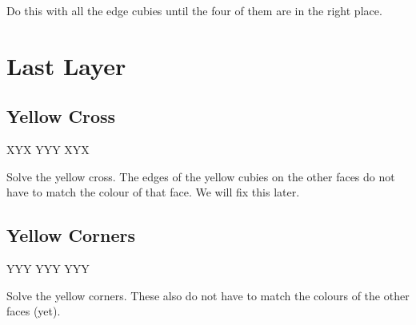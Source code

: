 \documentclass{article}
\begin{document}
    Do this with all the edge cubies until the four of them are in the right place.

    \section{Last Layer}

    \subsection{Yellow Cross}

    \RubikCubeGreyAll
    \RubikFaceUp XYX YYY XYX

    \begin{goal}[\DrawRubikFaceUp]
        Solve the yellow cross.
        The edges of the yellow cubies on the other faces do not have to match the colour of that face.
        We will fix this later.
    \end{goal}

    \subsection{Yellow Corners}
    \RubikCubeGreyAll
    \RubikFaceUp YYY YYY YYY

    \begin{goal}[\DrawRubikFaceUp]
        Solve the yellow corners.
        These also do not have to match the colours of the other faces (yet).
    \end{goal}
\end{document}
